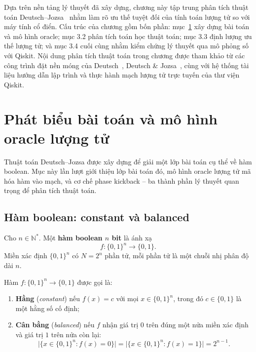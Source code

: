 Dựa trên nền tảng lý thuyết đã xây dựng, chương này tập trung phân tích thuật toán Deutsch--Jozsa~\cite{ref2} nhằm làm rõ ưu thế tuyệt đối của tính toán lượng tử so với máy tính cổ điển. Cấu trúc của chương gồm bốn phần: mục~\ref{sec:dj-problem} xây dựng bài toán và mô hình oracle; mục 3.2 phân tích toán học thuật toán; mục 3.3 định lượng ưu thế lượng tử; và mục 3.4 cuối cùng nhằm kiểm chứng lý thuyết qua mô phỏng số với Qiskit. Nội dung phân tích thuật toán trong chương được tham khảo từ các công trình đặt nền móng của Deutsch~\cite{ref1}, Deutsch \& Jozsa~\cite{ref2}, cùng với hệ thống tài liệu hướng dẫn lập trình và thực hành mạch lượng tử trực tuyến của thư viện Qiskit.
 
\section{Phát biểu bài toán và mô hình oracle lượng tử}
\label{sec:dj-problem}
 

Thuật toán Deutsch--Jozsa được xây dựng để giải một lớp bài toán cụ thể về hàm
boolean. Mục này lần lượt giới thiệu lớp bài toán đó, mô hình oracle lượng tử
mã hóa hàm vào mạch, và cơ chế phase kickback -- ba thành phần lý thuyết quan trọng để phân tích thuật toán.

\subsection*{Hàm boolean: constant và balanced}

\begin{definition}
Cho $n \in \mathbb{N}^*$. Một \textbf{hàm boolean $n$ bit} là ánh xạ
$$f \colon \{0,1\}^n \longrightarrow \{0,1\}.$$
Miền xác định $\{0,1\}^n$ có $N = 2^n$ phần tử, mỗi phần tử là một chuỗi
nhị phân độ dài $n$.
\end{definition}

\begin{definition}
\label{def:const-balanced}
Hàm $f \colon \{0,1\}^n \to \{0,1\}$ được gọi là:
\begin{enumerate}[label=(\roman*)]
    \item \textbf{Hằng} (\textit{constant}) nếu $f(x) = c$ với mọi
          $x \in \{0,1\}^n$, trong đó $c \in \{0,1\}$ là một hằng số cố định;
    \item \textbf{Cân bằng} (\textit{balanced}) nếu $f$ nhận giá trị $0$ trên
          đúng một nửa miền xác định và giá trị $1$ trên nửa còn lại:
          $$\bigl|\{x \in \{0,1\}^n : f(x)=0\}\bigr|
            = \bigl|\{x \in \{0,1\}^n : f(x)=1\}\bigr| = 2^{n-1}.$$
\end{enumerate}
\end{definition}

